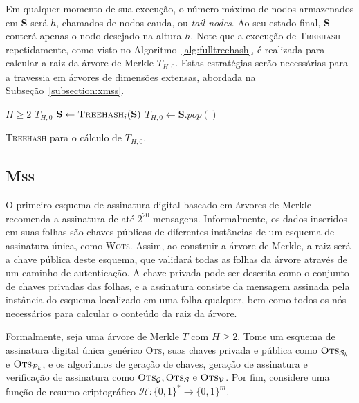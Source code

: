 \documentclass{ufsctex/ufsctex}
\newcommand{\hh}{\mathcal{H}}
\newcommand{\pk}{\mathcal{P}_{k}}
\newcommand{\sk}{\mathcal{S}_{k}}
\newcommand{\binwds}[1]{\{0, 1\}^{#1}}
\newcommand{\fhash}[1]{\hh{}: \binwds{*} \longrightarrow{} \binwds{#1}}
\newcommand{\wots}{\textsc{Wots}}
\newcommand{\mss}{\textsc{Mss}}
\begin{document}
Em qualquer momento de sua execução, o número máximo de nodos armazenados em
\textbf{S} será $h$, chamados de nodos cauda, ou \emph{tail nodes}. Ao seu
estado final, \textbf{S} conterá apenas o nodo desejado na altura $h$. Note que
a execução de \textsc{Treehash} repetidamente, como visto no
Algoritmo~\ref{alg:fulltreehash}, é realizada para calcular a raiz da árvore de
Merkle $T_{H, 0}$. Estas estratégias serão necessárias para a travessia em
árvores de dimensões extensas, abordada na Subseção~\ref{subsection:xmss}.

\begin{algorithm}
  \begin{algorithmic}
    \REQUIRE{} {$H \geq 2$} 
    \ENSURE{} {$T_{H, 0}$} 
      \STATE{}  $\mathbf{S} \leftarrow \textsc{Treehash}_{i}(\mathbf{S})$
    \ENDFOR{}
    \STATE{}  $T_{H, 0} \leftarrow \mathbf{S}.pop()$
  \end{algorithmic}
  \caption{\textsc{Treehash} para o
    cálculo de $T_{H, 0}$.}\label{alg:fulltreehash}
\end{algorithm}

\subsection{\mss{}}\label{subsection:mss}

O primeiro esquema de assinatura digital baseado em árvores de
Merkle~\cite[Capítulo 6]{Merkle:inproc:1989:aug} recomenda a assinatura de até
$2^{20}$ mensagens. Informalmente, os dados inseridos em suas folhas são chaves
públicas de diferentes instâncias de um esquema de assinatura única, como
\wots{}. Assim, ao construir a árvore de Merkle, a raiz será a chave pública
deste esquema, que validará todas as folhas da árvore através de um caminho de
autenticação. A chave privada pode ser descrita como o conjunto de chaves
privadas das folhas, e a assinatura consiste da mensagem assinada pela
instância do esquema localizado em uma folha qualquer, bem como todos os nós
necessários para calcular o conteúdo da raiz da árvore.

Formalmente, seja uma árvore de Merkle $T$ com $H \geq 2$. Tome um esquema de
assinatura digital única genérico \textsc{Ots}, suas chaves privada e pública
como $\textsc{Ots}_{\sk{}}$ e $\textsc{Ots}_{\pk{}}$, e os algoritmos de
geração de chaves, geração de assinatura e verificação de assinatura como
$\textsc{Ots}_\mathcal{G}, \textsc{Ots}_\mathcal{S} \text{ e }
\textsc{Ots}_\mathcal{V}$. Por fim, considere uma função de resumo
criptográfico $\fhash{m}$.
\end{document}
